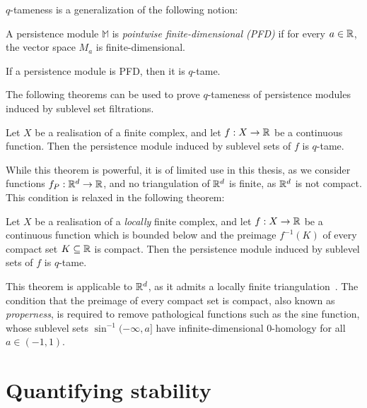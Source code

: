 $q$-tameness is a generalization of the following notion:
\begin{definition}
    A persistence module $\mathbb{M}$ is \emph{pointwise finite-dimensional
    (PFD)} if for every $a \in \mathbb{R}$, the vector space $M_a$ is
    finite-dimensional.
\end{definition}
\begin{lemma}
    \label{lem:tameness_pfd}
    If a persistence module is PFD, then it is $q$-tame.
\end{lemma}

The following theorems can be used to prove $q$-tameness of persistence modules
induced by sublevel set filtrations.
\begin{theorem}
    Let $X$ be a realisation of a finite complex, and let $f : X \to \mathbb{R}$ be a
    continuous function. Then the persistence module induced by sublevel sets of
    $f$ is $q$-tame.
\end{theorem}
While this theorem is powerful, it is of limited use in this thesis, as we
consider functions $f_P : \mathbb{R}^d \to \mathbb{R}$, and no triangulation of $\mathbb{R}^d$ is
finite, as $\mathbb{R}^d$ is not compact. This condition is relaxed in the following
theorem:
\begin{theorem}
    \label{thm:tameness_condition}
    Let $X$ be a realisation of a \emph{locally} finite complex, and let
    $f : X \to \mathbb{R}$ be a continuous function which is bounded below and
    the preimage $f^{-1}(K)$ of every compact set $K \subseteq \mathbb{R}$ is compact.
    Then the persistence module induced by sublevel sets of $f$ is $q$-tame.
\end{theorem}
This theorem is applicable to $\mathbb{R}^d$, as it admits a locally finite
triangulation~\cite{grafakos2008classical}. The condition that the preimage of
every compact set is compact, also known as \emph{properness}, is required to
remove pathological functions such as the sine function, whose sublevel sets
$\sin^{-1}(-\infty, a]$ have infinite-dimensional $0$-homology for all
$a \in (-1, 1)$.

\section{Quantifying stability}

